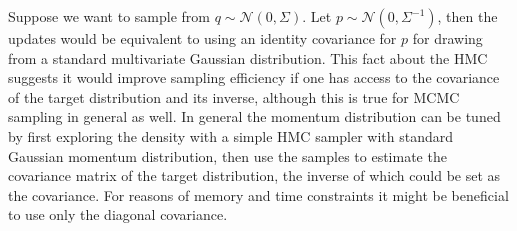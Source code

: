 \documentclass[]{report}
\begin{document}
Suppose we want to sample from $q \sim \mathcal{N}(0,\Sigma)$. Let $p \sim
\mathcal{N}(0,\Sigma^{-1})$, then the updates would be equivalent to using an
identity covariance for $p$ for drawing from a standard multivariate Gaussian
distribution. This
fact about the HMC suggests it would improve sampling efficiency if one has
access to the covariance of the target distribution and its inverse, although this is true for
MCMC sampling in general as well. 
In general the momentum distribution can be tuned by first exploring the density
with a simple HMC sampler with standard Gaussian momentum distribution, then use
the samples to estimate the covariance matrix of the target distribution, the
inverse of which could be set as the covariance.  For reasons of memory and time constraints it might be beneficial to use only the diagonal covariance. 
\end{document}
